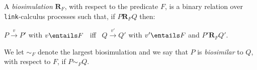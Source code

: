 \begin{definition}
A \emph{biosimulation} $\mathbf{R}_F$, with respect to the predicate $F$, is a binary relation over {\tt link}-calculus processes such that, if $P \mathrel{\mathbf{R}_F} Q$ then:
 \begin{center} %
 $P \xrightarrow{v} P'$ with $v \entails F$ \, iff  \, $Q  \xrightarrow{v'} Q'$ with $v' \entails F$ and $P' \mathrel{\mathbf{R}_F} Q'$.
 \end{center}
\noindent
We let $ \sim_F $ denote the largest  biosimulation and we say that $P$ is \emph{biosimilar} to $Q$, with respect to $F$, if $P \sim_F Q$.
\end{definition}




